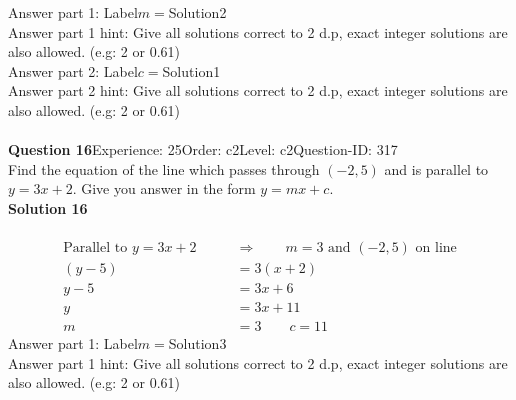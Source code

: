 \documentclass{article}
\begin{document}
Answer part 1: \hspace{10pt}Label\hspace{10pt}$m=$\hspace{10pt}Solution\hspace{10pt}2\\
Answer part 1 hint: \hspace{15pt}Give all solutions correct to 2 d.p, exact integer solutions are also allowed. (e.g: 2 or 0.61)\\
Answer part 2: \hspace{10pt}Label\hspace{10pt}$c=$\hspace{10pt}Solution\hspace{10pt}1\\
Answer part 2 hint: \hspace{15pt}Give all solutions correct to 2 d.p, exact integer solutions are also allowed. (e.g: 2 or 0.61)\\
\\[4pt]
\noindent\textbf{Question 16}\hspace{20pt}Experience: 25\hspace{20pt}Order: c2\hspace{20pt}Level: c2\hspace{20pt}Question-ID: 317\\[2pt]
Find the equation of the line which passes through $(-2,5)$ and is parallel to $y=3x+2$. Give you answer in the form $y=mx+c$.\\[4pt]
\noindent\textbf{Solution 16}\\[2pt]
\\[-35pt]\begin{align*}
\text{Parallel to}\,\,y=3x+2\qquad &\Rightarrow \qquad m=3\,\, \text{and}\,\, (-2,5)\,\, \text{on line}\\[2pt]
(y-5)&=3(x+2)\\[2pt]
y-5&=3x+6\\[2pt]
y&=3x+11\\[2pt]
m&=3\qquad c=11
\end{align*}
Answer part 1: \hspace{10pt}Label\hspace{10pt}$m=$\hspace{10pt}Solution\hspace{10pt}3\\
Answer part 1 hint: \hspace{15pt}Give all solutions correct to 2 d.p, exact integer solutions are also allowed. (e.g: 2 or 0.61)\\
\end{document}
